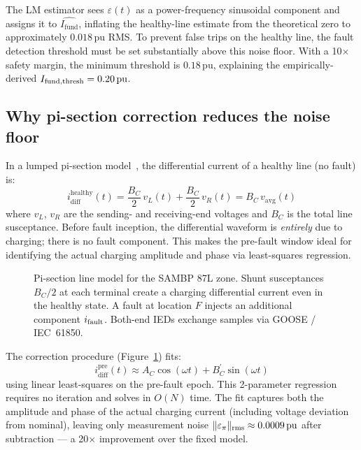 \documentclass[11pt,a4paper]{article}
\newcommand{\Ifund}{I_{\mathrm{fund}}}
\newcommand{\BC}{B_C}
\newcommand{\eps}{\varepsilon}
\newcommand{\pu}{\,\text{pu}}
\begin{document}
The LM estimator sees $\eps(t)$ as a power-frequency sinusoidal component
and assigns it to $\hat{\Ifund}$, inflating the healthy-line estimate from
the theoretical zero to approximately $0.018\pu$ RMS.  To prevent false
trips on the healthy line, the fault detection threshold must be set
substantially above this noise floor.  With a 10$\times$ safety margin, the
minimum threshold is $0.18\pu$, explaining the empirically-derived
$I_{\rm fund,thresh} = 0.20\pu$.

\subsection{Why pi-section correction reduces the noise floor}

In a lumped pi-section model~\cite{Glover2012}, the differential current of a
healthy line (no fault) is:
\begin{equation}
  i_{\mathrm{diff}}^{\mathrm{healthy}}(t) =
      \frac{\BC}{2}\,v_L(t) + \frac{\BC}{2}\,v_R(t)
  = \BC\, v_{\mathrm{avg}}(t)
  \label{eq:pi_healthy}
\end{equation}
where $v_L$, $v_R$ are the sending- and receiving-end voltages and $\BC$ is
the total line susceptance.  Before fault inception, the differential waveform
is \emph{entirely} due to charging; there is no fault component.  This makes
the pre-fault window ideal for identifying the actual charging amplitude and
phase via least-squares regression.

\begin{figure}[h]
  \centering
  \resizebox{\columnwidth}{!}{}
  \caption{Pi-section line model for the SAMBP 87L zone.  Shunt susceptances
           $\BC/2$ at each terminal create a charging differential current even
           in the healthy state.  A fault at location $F$ injects an additional
           component $i_{\rm fault}$.  Both-end IEDs exchange samples via
           GOOSE / IEC~61850.}
  \label{fig:pi_circuit}
\end{figure}

The correction procedure (Figure~\ref{fig:pi_circuit}) fits:
\begin{equation}
  i_{\mathrm{diff}}^{\mathrm{pre}}(t) \approx A_C \cos(\omega t) + B_C^{\prime} \sin(\omega t)
  \label{eq:prefault_fit}
\end{equation}
using linear least-squares on the pre-fault epoch.  This 2-parameter regression
requires no iteration and solves in $O(N)$ time.  The fit captures both the
amplitude and phase of the actual charging current (including voltage deviation
from nominal), leaving only measurement noise $\|\eps_{\pi}\|_{\rm rms} \approx
0.0009\pu$ after subtraction --- a 20$\times$ improvement over the fixed model.
\end{document}
